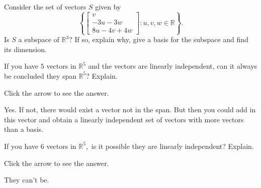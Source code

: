 \documentclass{ximera}
\begin{document}
\begin{problem}\label{prb:5.23} Consider the set of vectors $S$ given by
\begin{equation*}
\left\{ \left[
\begin{array}{c}
v \\
-3u-3w \\
8u-4v+4w
\end{array}
\right] :u,v,w\in \mathbb{R}\right\} .
\end{equation*}
Is $S$ a subspace of $\mathbb{R}^{3}?$ If so, explain why,
give a basis for the subspace and find its dimension.
\end{problem}

\begin{problem}\label{prb:5.24} If you have $5$ vectors in $\mathbb{R}^{5}$ and the vectors are
linearly independent, can it always be concluded they span $\mathbb{R}^{5}?$
Explain.

Click the arrow to see the answer.  
\begin{expandable}
 Yes. If not, there would exist a vector not in the span. But then
you could add in this vector and obtain a linearly independent set of
vectors with more vectors than a basis.
\end{expandable}
\end{problem}

\begin{problem}\label{prb:5.25} If you have $6$ vectors in $\mathbb{R}^{5},$ is it possible they are
linearly independent? Explain.

Click the arrow to see the answer.  
\begin{expandable}
They can't be.
\end{expandable}
\end{problem}


\end{document}
